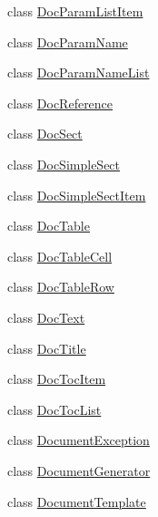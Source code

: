 \begin{DoxyCompactItemize}
\item 
class \hyperlink{class_software_engineering_tools_1_1_documentation_1_1_doc_param_list_item}{Doc\+Param\+List\+Item}
\item 
class \hyperlink{class_software_engineering_tools_1_1_documentation_1_1_doc_param_name}{Doc\+Param\+Name}
\item 
class \hyperlink{class_software_engineering_tools_1_1_documentation_1_1_doc_param_name_list}{Doc\+Param\+Name\+List}
\item 
class \hyperlink{class_software_engineering_tools_1_1_documentation_1_1_doc_reference}{Doc\+Reference}
\item 
class \hyperlink{class_software_engineering_tools_1_1_documentation_1_1_doc_sect}{Doc\+Sect}
\item 
class \hyperlink{class_software_engineering_tools_1_1_documentation_1_1_doc_simple_sect}{Doc\+Simple\+Sect}
\item 
class \hyperlink{class_software_engineering_tools_1_1_documentation_1_1_doc_simple_sect_item}{Doc\+Simple\+Sect\+Item}
\item 
class \hyperlink{class_software_engineering_tools_1_1_documentation_1_1_doc_table}{Doc\+Table}
\item 
class \hyperlink{class_software_engineering_tools_1_1_documentation_1_1_doc_table_cell}{Doc\+Table\+Cell}
\item 
class \hyperlink{class_software_engineering_tools_1_1_documentation_1_1_doc_table_row}{Doc\+Table\+Row}
\item 
class \hyperlink{class_software_engineering_tools_1_1_documentation_1_1_doc_text}{Doc\+Text}
\item 
class \hyperlink{class_software_engineering_tools_1_1_documentation_1_1_doc_title}{Doc\+Title}
\item 
class \hyperlink{class_software_engineering_tools_1_1_documentation_1_1_doc_toc_item}{Doc\+Toc\+Item}
\item 
class \hyperlink{class_software_engineering_tools_1_1_documentation_1_1_doc_toc_list}{Doc\+Toc\+List}
\item 
class \hyperlink{class_software_engineering_tools_1_1_documentation_1_1_document_exception}{Document\+Exception}
\item 
class \hyperlink{class_software_engineering_tools_1_1_documentation_1_1_document_generator}{Document\+Generator}
\item 
class \hyperlink{class_software_engineering_tools_1_1_documentation_1_1_document_template}{Document\+Template}
\item 

\end{DoxyCompactItemize}
